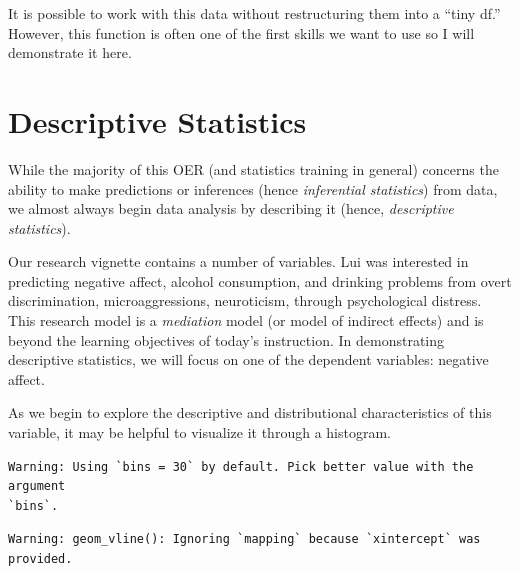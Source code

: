 \documentclass[
  11pt,
]{book}
\newenvironment{Shaded}{\begin{snugshade}}{\end{snugshade}}
\newcommand{\AttributeTok}[1]{\textcolor[rgb]{0.77,0.63,0.00}{#1}}
\newcommand{\ConstantTok}[1]{\textcolor[rgb]{0.00,0.00,0.00}{#1}}
\newcommand{\FunctionTok}[1]{\textcolor[rgb]{0.00,0.00,0.00}{#1}}
\newcommand{\NormalTok}[1]{#1}
\newcommand{\SpecialCharTok}[1]{\textcolor[rgb]{0.00,0.00,0.00}{#1}}
\newcommand{\StringTok}[1]{\textcolor[rgb]{0.31,0.60,0.02}{#1}}
\begin{document}
It is possible to work with this data without restructuring them into a ``tiny df.'' However, this function is often one of the first skills we want to use so I will demonstrate it here.

\hypertarget{descriptive-statistics}{%
\section{Descriptive Statistics}\label{descriptive-statistics}}

While the majority of this OER (and statistics training in general) concerns the ability to make predictions or inferences (hence \emph{inferential statistics}) from data, we almost always begin data analysis by describing it (hence, \emph{descriptive statistics}).

Our research vignette contains a number of variables. Lui \citeyearpar{lui_racial_2020} was interested in predicting negative affect, alcohol consumption, and drinking problems from overt discrimination, microaggressions, neuroticism, through psychological distress. This research model is a \emph{mediation} model (or model of indirect effects) and is beyond the learning objectives of today's instruction. In demonstrating descriptive statistics, we will focus on one of the dependent variables: negative affect.

As we begin to explore the descriptive and distributional characteristics of this variable, it may be helpful to visualize it through a histogram.

\begin{Shaded}
\end{Shaded}

\begin{verbatim}
Warning: Using `bins = 30` by default. Pick better value with the argument
`bins`.
\end{verbatim}

\begin{verbatim}
Warning: geom_vline(): Ignoring `mapping` because `xintercept` was provided.
\end{verbatim}
\end{document}
